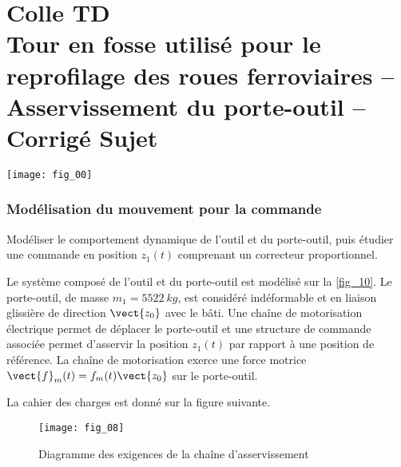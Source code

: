 \chapter*{\ifcolle Colle   \else TD  \fi \\ 
Tour en fosse utilisé pour le reprofilage des roues ferroviaires -- Asservissement du porte-outil -- \ifprof Corrigé \else Sujet \fi}


\iflivret \ifcolle {}  \else {} \fi   \else
\ifprof  \ifcolle {}  \else {} \fi \else \fi
\fi
\setcounter{question}{0}

\begin{marginfigure}
\centering
\texttt{[image: fig\_00]}
\end{marginfigure}



\subsection*{Modélisation du mouvement pour la commande}
\ifprof
\else
\begin{obj}
Modéliser le comportement dynamique de l’outil et du porte-outil, puis étudier une commande en
position $z_1(t)$ comprenant un correcteur proportionnel.
\end{obj}

Le système composé de l’outil et du porte-outil est modélisé sur la \autoref{fig_10}. Le porte-outil, de masse $m_1 = \SI{5522}{kg}$,
est considéré indéformable et en liaison glissière de direction $\vect{z_0}$ avec le bâti. Une chaîne de motorisation électrique
permet de déplacer le porte-outil et une structure de commande associée permet d’asservir la position
$z_1(t)$ par rapport à une position de référence. La chaîne de motorisation exerce une force motrice $\vect{f}_m(t) =f_m(t)\vect{z_0}$
sur le porte-outil.

La cahier des charges est donné sur la figure suivante.

\begin{figure}[H]
\centering
\texttt{[image: fig\_08]}
\caption{Diagramme des exigences de la chaîne d'asservissement \label{fig_08}}
\end{figure}


